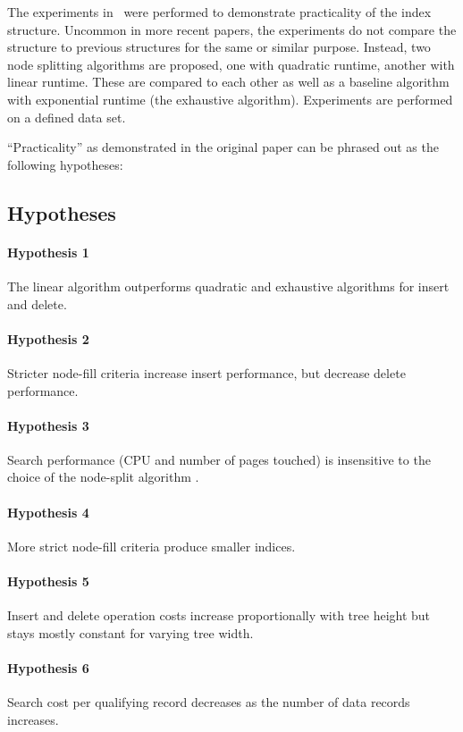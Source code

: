 The experiments in~\cite{DBLP:conf/sigmod/Guttman84} were performed to demonstrate practicality of 
the index structure. Uncommon in more recent papers, the experiments do not compare the structure to 
previous structures for the same or similar purpose. Instead, two node splitting algorithms are proposed, 
one with quadratic runtime, another with linear runtime.
These are compared to each other as well as a baseline 
algorithm with exponential runtime (the exhaustive algorithm). Experiments are performed on a defined data set. 

``Practicality'' as demonstrated in the original paper can be phrased out as the following hypotheses: 
\subsection{Hypotheses}
\paragraph{Hypothesis 1}
The linear algorithm outperforms quadratic and exhaustive algorithms for insert and delete.

\paragraph{Hypothesis 2}
Stricter node-fill criteria increase insert performance, but decrease delete performance.

\paragraph{Hypothesis 3}
Search performance (CPU and number of pages touched) is insensitive to the choice of the node-split algorithm .

\paragraph{Hypothesis 4}
More strict node-fill criteria produce smaller indices.

\paragraph{Hypothesis 5}
Insert and delete operation costs increase proportionally with tree height but stays mostly constant for varying tree width.

\paragraph{Hypothesis 6}
Search cost per qualifying record decreases as the number of data records increases.


